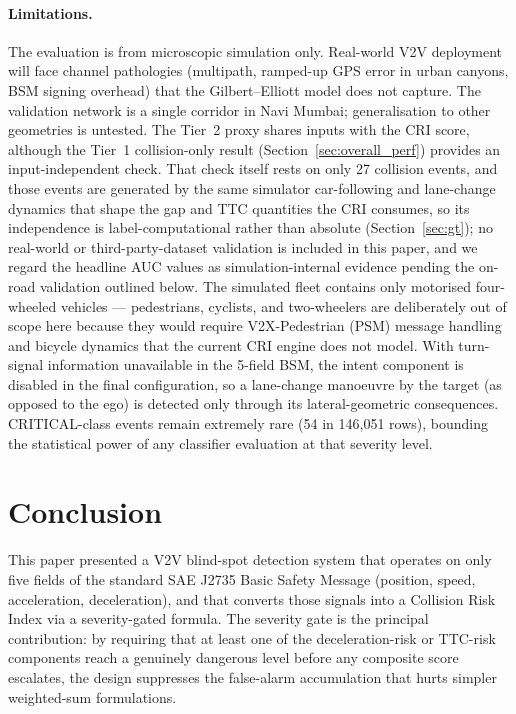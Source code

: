 \documentclass[sn-mathphys-num,Numbered,iicol]{sn-jnl}
\begin{document}
\paragraph{Limitations.}
The evaluation is from microscopic simulation only. Real-world V2V deployment will face channel pathologies (multipath, ramped-up GPS error in urban canyons, BSM signing overhead) that the Gilbert--Elliott model does not capture. The validation network is a single corridor in Navi Mumbai; generalisation to other geometries is untested. The Tier~2 proxy shares inputs with the CRI score, although the Tier~1 collision-only result (Section~\ref{sec:overall_perf}) provides an input-independent check. That check itself rests on only 27 collision events, and those events are generated by the same simulator car-following and lane-change dynamics that shape the gap and TTC quantities the CRI consumes, so its independence is label-computational rather than absolute (Section~\ref{sec:gt}); no real-world or third-party-dataset validation is included in this paper, and we regard the headline AUC values as simulation-internal evidence pending the on-road validation outlined below. The simulated fleet contains only motorised four-wheeled vehicles --- pedestrians, cyclists, and two-wheelers are deliberately out of scope here because they would require V2X-Pedestrian (PSM) message handling and bicycle dynamics that the current CRI engine does not model. With turn-signal information unavailable in the 5-field BSM, the intent component is disabled in the final configuration, so a lane-change manoeuvre by the target (as opposed to the ego) is detected only through its lateral-geometric consequences. CRITICAL-class events remain extremely rare (54 in 146{,}051 rows), bounding the statistical power of any classifier evaluation at that severity level.

\section{Conclusion}\label{sec:conclusion}

This paper presented a V2V blind-spot detection system that operates on only five fields of the standard SAE J2735 Basic Safety Message (position, speed, acceleration, deceleration), and that converts those signals into a Collision Risk Index via a severity-gated formula. The severity gate is the principal contribution: by requiring that at least one of the deceleration-risk or TTC-risk components reach a genuinely dangerous level before any composite score escalates, the design suppresses the false-alarm accumulation that hurts simpler weighted-sum formulations.
\end{document}
